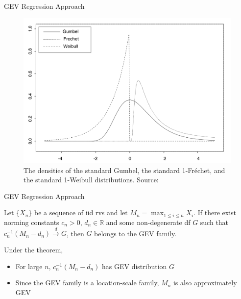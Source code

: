 \documentclass{beamer}
\begin{document}
\begin{frame}{GEV Regression Approach}
    \begin{figure}
        \centering
        \includegraphics[scale=0.5]{std_evd_densities.png}
        \caption{The densities of the standard Gumbel, the standard 1-Fr\'{e}chet, and the standard 1-Weibull distributions. Source: \cite{embrechts1997mode}}
        \label{fig:std_evd_densities}
    \end{figure}
\end{frame}

\begin{frame}{GEV Regression Approach}
    \begin{theorem}
        Let $\{X_n\}$ be a sequence of iid rvs and let $M_n = \max_{1 \le i \le n} X_i$. If there exist norming constants $c_n > 0$, $d_n \in \mathbb{R}$ and some non-degenerate df $G$ such that $c_n^{-1}(M_n - d_n) \xrightarrow{d} G$, then $G$ belongs to the GEV family.
    \end{theorem}
    Under the theorem,
    \begin{itemize}
        \item For large $n$, $c_n^{-1}(M_n - d_n)$ has GEV distribution $G$
        \item Since the GEV family is a location-scale family, $M_n$ is also approximately GEV
    \end{itemize}
\end{frame}
\end{document}
